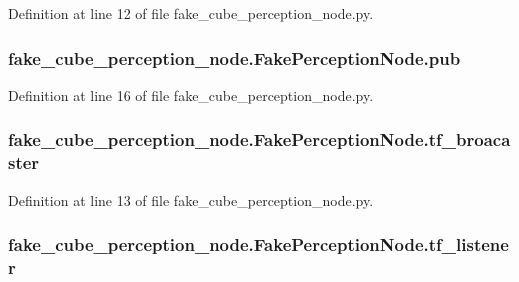 Definition at line 12 of file fake\+\_\+cube\+\_\+perception\+\_\+node.\+py.

\subsubsection[{\texorpdfstring{pub}{pub}}]{\setlength{\rightskip}{0pt plus 5cm}fake\+\_\+cube\+\_\+perception\+\_\+node.\+Fake\+Perception\+Node.\+pub}\hypertarget{classfake__cube__perception__node_1_1FakePerceptionNode_a6e2d7e3ce4c1808f5bf033293a2d511d}{}\label{classfake__cube__perception__node_1_1FakePerceptionNode_a6e2d7e3ce4c1808f5bf033293a2d511d}


Definition at line 16 of file fake\+\_\+cube\+\_\+perception\+\_\+node.\+py.

\subsubsection[{\texorpdfstring{tf\+\_\+broacaster}{tf_broacaster}}]{\setlength{\rightskip}{0pt plus 5cm}fake\+\_\+cube\+\_\+perception\+\_\+node.\+Fake\+Perception\+Node.\+tf\+\_\+broacaster}\hypertarget{classfake__cube__perception__node_1_1FakePerceptionNode_a6f4046762e6ee49202366e4df6a2a60c}{}\label{classfake__cube__perception__node_1_1FakePerceptionNode_a6f4046762e6ee49202366e4df6a2a60c}


Definition at line 13 of file fake\+\_\+cube\+\_\+perception\+\_\+node.\+py.

\subsubsection[{\texorpdfstring{tf\+\_\+listener}{tf_listener}}]{\setlength{\rightskip}{0pt plus 5cm}fake\+\_\+cube\+\_\+perception\+\_\+node.\+Fake\+Perception\+Node.\+tf\+\_\+listener}\hypertarget{classfake__cube__perception__node_1_1FakePerceptionNode_a8e6364816c392f5118ad16c794adc142}{}\label{classfake__cube__perception__node_1_1FakePerceptionNode_a8e6364816c392f5118ad16c794adc142}


